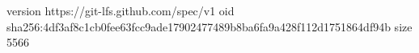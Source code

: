 version https://git-lfs.github.com/spec/v1
oid sha256:4df3af8c1cb0fee63fcc9ade17902477489b8ba6fa9a428f112d1751864df94b
size 5566
